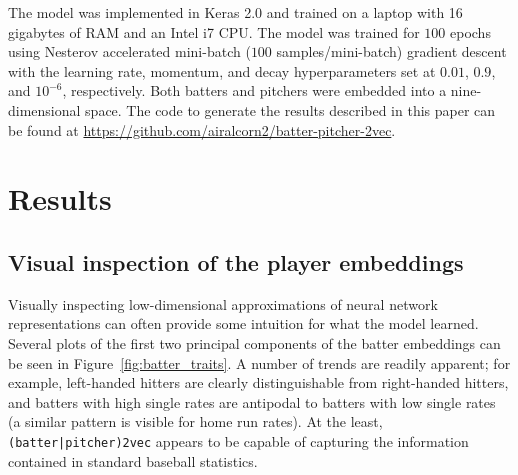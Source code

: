 \documentclass{article}
\begin{document}
The model was implemented in Keras 2.0 \parencite{Keras2015} and trained on a laptop with 16 gigabytes of RAM and an Intel i7 CPU. The model was trained for $100$ epochs using Nesterov accelerated mini-batch ($100$ samples/mini-batch) gradient descent with the learning rate, momentum, and decay hyperparameters set at $0.01$, $0.9$, and $10^{-6}$, respectively. Both batters and pitchers were embedded into a nine-dimensional space. The code to generate the results described in this paper can be found at \url{https://github.com/airalcorn2/batter-pitcher-2vec}.

\section{Results}
\label{results}

\subsection{Visual inspection of the player embeddings}

Visually inspecting low-dimensional approximations of neural network representations can often provide some intuition for what the model learned. Several plots of the first two principal components of the batter embeddings can be seen in Figure~\ref{fig:batter_traits}. A number of trends are readily apparent; for example, left-handed hitters are clearly distinguishable from right-handed hitters, and batters with high single rates are antipodal to batters with low single rates (a similar pattern is visible for home run rates). At the least, \texttt{(batter|pitcher)2vec} appears to be capable of capturing the information contained in standard baseball statistics.
\end{document}
